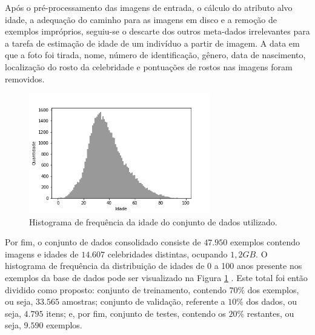 Após o pré-processamento das imagens de entrada, o cálculo do atributo alvo idade, a adequação do caminho para as imagens em disco e a remoção de exemplos impróprios, seguiu-se o descarte dos outros meta-dados irrelevantes para a tarefa de estimação de idade de um indivíduo a partir de imagem. A data em que a foto foi tirada, nome, número de identificação, gênero, data de nascimento, localização do rosto da celebridade e pontuações de rostos nas imagens foram removidos.

\begin{figure}[!ht]
    \centering
     \includegraphics[width=0.7\textwidth]{img/idade_hist_clean}
     \caption{Histograma de frequência da idade do conjunto de dados utilizado.}
     \label{fig:hist}
\end{figure}

Por fim, o conjunto de dados consolidado consiste de $47.950$ exemplos contendo imagens e idades de $14.607$ celebridades distintas, ocupando $1,2 GB$. O histograma de frequência da distribuição de idades de 0 a 100 anos presente nos exemplos da base de dados pode ser visualizado na Figura \ref{fig:hist} \cite{acharya2005image}. Este total foi então dividido como proposto: conjunto de treinamento, contendo $70\%$ dos exemplos, ou seja, $33.565$ amostras; conjunto de validação, referente a $10\%$ dos dados, ou seja, $4.795$ itens; e, por fim, conjunto de testes, contendo os $20\%$ restantes, ou seja, $9.590$ exemplos.
